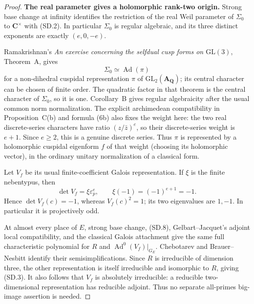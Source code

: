\documentclass[11pt,a4paper]{article}
\theoremstyle{definition}
\renewcommand{\paragraph}[1]{\par\smallskip\noindent\textbf{#1}\quad\ignorespaces}
\begin{document}
\begin{proof}
\paragraph{The real parameter gives a holomorphic rank-two origin.}
Strong base change at infinity identifies the restriction of the
real Weil parameter of $\Sigma_0$ to $\mathbf C^\times$ with
(SD.2).  In particular $\Sigma_0$ is regular algebraic, and its
three distinct exponents are exactly $(e,0,-e)$.

Ramakrishnan's \emph{An exercise concerning the selfdual cusp forms
on $\mathrm{GL}(3)$}, Theorem~A, gives
\[
                            \Sigma_0\simeq\operatorname{Ad}(\pi)
                                                               \tag{SD.8}
\]
for a non-dihedral cuspidal representation $\pi$ of
$\mathrm{GL}_2(\mathbf A_{\mathbf Q})$; its central character
can be chosen of finite order.  The quadratic factor in that
theorem is the central character of $\Sigma_0$, so it is one.
Corollary~B gives regular algebraicity after the usual common
norm normalization.  The explicit archimedean compatibility
in Proposition~C(b) and formula (6b) also fixes the weight here:
the two real discrete-series characters have ratio
$(z/\bar z)^e$, so their discrete-series weight is $e+1$.
Since $e\ge2$, this is a genuine discrete series.  Thus $\pi$
is represented by a holomorphic cuspidal eigenform $f$ of that
weight (choosing its holomorphic vector), in the ordinary
unitary normalization of a classical form.

Let $V_f$ be its usual finite-coefficient Galois representation.
If $\xi$ is the finite nebentypus, then
\[
                 \det V_f=\xi\varepsilon_p^e,
                 \qquad \xi(-1)=(-1)^{e+1}=-1.           \tag{SD.9}
\]
Hence $\det V_f(c)=-1$, whereas $V_f(c)^2=1$; its two
eigenvalues are $1,-1$.  In particular it is projectively odd.

At almost every place of $E$, strong base change, (SD.8),
Gelbart--Jacquet's adjoint local compatibility, and the classical
Galois attachment give the same full characteristic polynomial
for $R$ and $\operatorname{Ad}^0(V_f)|_{G_E}$.  Chebotarev and
Brauer--Nesbitt identify their semisimplifications.  Since $R$
is irreducible of dimension three, the other representation
is itself irreducible and isomorphic to $R$, giving (SD.3).
It also follows that $V_f$ is absolutely irreducible: a
reducible two-dimensional representation has reducible adjoint.
Thus no separate all-primes big-image assertion is needed.
\end{proof}
\end{document}
